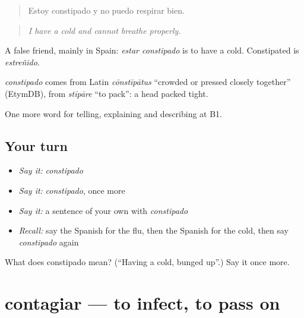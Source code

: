 \begin{quote}
Estoy constipado y no puedo respirar bien.
\end{quote}

\begin{quote}
\emph{I have a cold and cannot breathe properly.}
\end{quote}

A false friend, mainly in Spain: \emph{estar constipado} is to have a cold. Constipated is \emph{estreñido}.

\begin{cousinweb}
\emph{constipado} comes from Latin \emph{cōnstīpātus} \textquotedblleft{}crowded or pressed closely together\textquotedblright{} (EtymDB), from \emph{stīpāre} \textquotedblleft{}to pack\textquotedblright{}: a head packed tight.
\end{cousinweb}

\begin{grammarlens}[title={What you've built}]
One more word for telling, explaining and describing at B1.
\end{grammarlens}

\subsection*{Your turn}
\begin{itemize}
\raggedright
  \item \emph{Say it:} \emph{constipado}
  \item \emph{Say it:} \emph{constipado}, once more
  \item \emph{Say it:} a sentence of your own with \emph{constipado}
  \item \emph{Recall:} say the Spanish for the flu, then the Spanish for the cold, then say \emph{constipado} again
\end{itemize}

\begin{tcolorbox}[breakable,colback=teal!4,colframe=teal!35!black,title={Before you move on}]
What does constipado mean? (\textquotedblleft{}Having a cold, bunged up\textquotedblright{}.) Say it once more.
\end{tcolorbox}
\section[contagiar]{contagiar — to infect, to pass on}

\label{lesson:ES-C733-contagiar}




